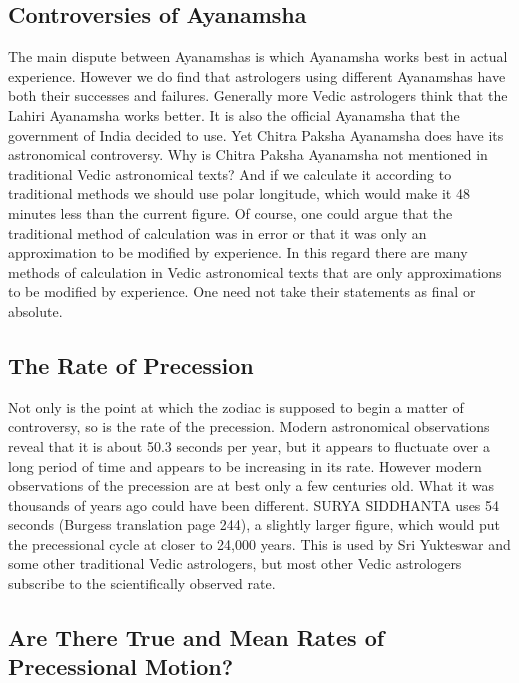  

\subsection{Controversies of Ayanamsha}
 

The main dispute between Ayanamshas is which Ayanamsha works best in actual experience. However we do find that astrologers using different Ayanamshas have both their successes and failures. Generally more Vedic astrologers think that the Lahiri Ayanamsha works better. It is also the official Ayanamsha that the government of India decided to use. Yet Chitra Paksha Ayanamsha does have its astronomical controversy. Why is Chitra Paksha Ayanamsha not mentioned in traditional Vedic astronomical texts? And if we calculate it according to traditional methods we should use polar longitude, which would make it 48 minutes less than the current figure. Of course, one could argue that the traditional method of calculation was in error or that it was only an approximation to be modified by experience. In this regard there are many methods of calculation in Vedic astronomical texts that are only approximations to be modified by experience. One need not take their statements as final or absolute.

 

\subsection{The Rate of Precession}

 

Not only is the point at which the zodiac is supposed to begin a matter of controversy, so is the rate of the precession. Modern astronomical observations reveal that it is about 50.3 seconds per year, but it appears to fluctuate over a long period of time and appears to be increasing in its rate. However modern observations of the precession are at best only a few centuries old. What it was thousands of years ago could have been different. SURYA SIDDHANTA uses 54 seconds (Burgess translation page 244), a slightly larger figure, which would put the precessional cycle at closer to 24,000 years. This is used by Sri Yukteswar and some other traditional Vedic astrologers, but most other Vedic astrologers subscribe to the scientifically observed rate.

 

\subsection{Are There True and Mean Rates of Precessional Motion?}

